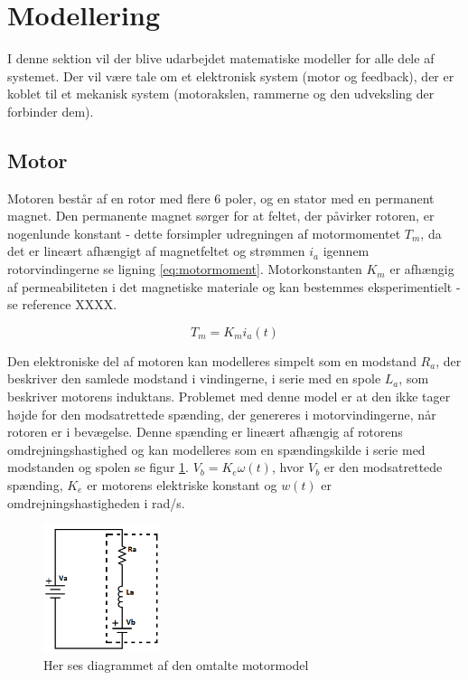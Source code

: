 \section{Modellering}
I denne sektion vil der blive udarbejdet matematiske modeller for alle dele af systemet. Der vil være tale om et elektronisk system (motor og feedback), der er koblet til et mekanisk system (motorakslen, rammerne og den udveksling der forbinder dem). 

\subsection{Motor}
Motoren består af en rotor med flere 6 poler, og en stator med en permanent magnet. Den permanente magnet sørger for at feltet, der påvirker rotoren, er nogenlunde konstant - dette forsimpler udregningen af motormomentet $T_{m}$, da det er lineært afhængigt af magnetfeltet og strømmen $i_{a}$ igennem rotorvindingerne se ligning \ref{eq:motormoment}. Motorkonstanten $K_{m}$ er afhængig af permeabiliteten i det magnetiske materiale og kan bestemmes eksperimentielt - se reference \cite{azevedo2013} XXXX.

\begin{equation}\label{eq:motormoment}
T_{m}=K_{m}i_{a}(t)
\end{equation}

Den elektroniske del af motoren kan modelleres simpelt som en modstand $R_{a}$, der beskriver den samlede modstand i vindingerne, i serie med en spole $L_{a}$, som beskriver motorens induktans. Problemet med denne model er at den ikke tager højde for den modsatrettede spænding, der genereres i motorvindingerne, når rotoren er i bevægelse. Denne spænding er lineært afhængig af rotorens omdrejningshastighed og kan modelleres som en spændingskilde i serie med modstanden og spolen se figur \ref{fig:motor_sch}. $V_{b}=K_{e}\omega(t)$, hvor $V_{b}$ er den modsatrettede spænding, $K_{e}$ er motorens elektriske konstant og $w(t)$ er omdrejningshastigheden i rad/s.\\

\begin{figure}
	\centering
	\includegraphics[width=0.3\textwidth]{Billeder/Motormodel.png}
	\caption{Her ses diagrammet af den omtalte motormodel}
	\label{fig:motor_sch}
\end{figure}

